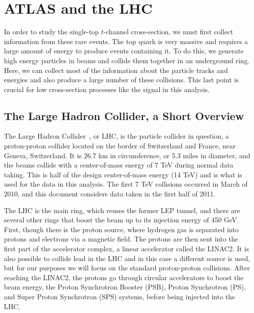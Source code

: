 \chapter{ATLAS and the LHC}
In order to study the single-top $t$-channel cross-section, we must first collect information from these rare events.  The top quark is very massive and requires a large amount of energy to produce events containing it.  To do this, we generate high energy particles in beams and collide them together in an underground ring.  Here, we can collect most of the information about the particle tracks and energies and also produce a large number of these collisions.  This last point is crucial for low cross-section processes like the signal in this analysis.

\section{The Large Hadron Collider, a Short Overview}\label{sec:LHC} 
The Large Hadron Collider~\cite{LHCoverview}, or LHC, is the particle collider in question, a proton-proton collider located on the border of Switzerland and France, near Geneva, Switzerland.  It is 26.7 km in circumference, or 5.3 miles in diameter, and the beams collide with a center-of-mass energy of 7 TeV during normal data taking.  This is half of the design center-of-mass energy (14 TeV) and is what is used for the data in this analysis.  The first 7 TeV collisions occurred in March of 2010, and this document considers data taken in the first half of 2011.

The LHC is the main ring, which reuses the former LEP tunnel, and there are several other rings that boost the beam up to its injection energy of 450 GeV.  First, though there is the proton source, where hydrogen gas is separated into protons and electrons via a magnetic field.  The protons are then sent into the first part of the accelerator complex, a linear accelerator called the LINAC2.  It is also possible to collide lead in the LHC and in this case a different source is used, but for our purposes we will focus on the standard proton-proton collisions.  After reaching the LINAC2, the protons go through circular accelerators to boost the beam energy, the Proton Synchrotron Booster (PSB), Proton Synchrotron (PS), and Super Proton Synchrotron (SPS) systems, before being injected into the LHC.

